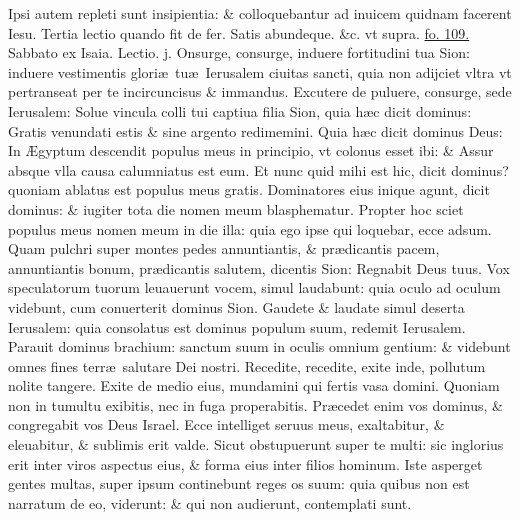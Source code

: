 \documentclass[a5paper,10pt]{book}
\def\leftmarginnote{%
	\lrmarginnote{\hskip -\marginparsep \hskip -6.5em}}
\def\ae{æ}
\def\AE{Æ}
\begin{document}
\begin{multicols*}{2}
Ipsi autem repleti sunt insipientia: \& colloquebantur ad inuicem quidnam facerent Iesu.
\newline \color{red} Tertia lectio quando fit de fer. \color{black} Satis abundeque. \color{red} \&c. vt supra. \color{black} \hyperlink{page.109}{fo. 109.}
\newline {} \color{red} \hypertarget{SAT-SECUNDA-ADV}{Sabbato} ex Isaia. \hfill Lectio. j. \color{black}
\vspace{-.25em}
Onsurge,\leftmarginnote{\begin{flushright}c. 52.\end{flushright}} consurge, induere fortitudini tua Sion: induere vestimentis glori\ae \ tu\ae \ Ierusalem ciuitas sancti, quia non adijciet vltra vt pertranseat per te incircuncisus \& immandus.
Excutere de puluere, consurge, sede Ierusalem: Solue vincula colli tui captiua filia Sion, quia h\ae c dicit dominus: Gratis venundati estis \& sine argento redimemini.
Quia h\ae c dicit dominus Deus: In \AE gyptum descendit populus meus in principio, vt colonus esset ibi: \& Assur absque vlla causa calumniatus est eum.
Et nunc quid mihi est hic, dicit dominus? quoniam ablatus est populus meus gratis.
Dominatores eius inique agunt, dicit dominus: \& iugiter tota die nomen meum blasphematur.
Propter hoc sciet populus meus nomen meum in die illa: quia ego ipse qui loquebar, ecce adsum.
Quam pulchri super montes pedes annuntiantis, \& pr\ae dicantis pacem, annuntiantis bonum, pr\ae dicantis salutem, dicentis Sion: Regnabit Deus tuus.
Vox speculatorum tuorum leuauerunt
vocem, simul laudabunt: quia oculo ad oculum videbunt, cum conuerterit dominus Sion.
Gaudete \& laudate simul deserta Ierusalem: quia consolatus est dominus populum suum, redemit Ierusalem.
Parauit dominus brachium: sanctum suum in oculis omnium gentium: \& videbunt omnes fines terr\ae \ salutare Dei nostri.
Recedite, recedite, exite inde, pollutum nolite tangere.
Exite de medio eius, mundamini qui fertis vasa domini.
Quoniam non in tumultu exibitis, nec in fuga properabitis.
Pr\ae cedet enim vos dominus, \& congregabit vos Deus Israel.
Ecce intelliget seruus meus, exaltabitur, \& eleuabitur, \& sublimis erit valde.
Sicut obstupuerunt super te multi: sic inglorius erit inter viros aspectus eius, \& forma eius inter filios hominum.
Iste asperget gentes multas, super ipsum continebunt reges os suum: quia quibus non est narratum de eo, viderunt: \& qui non audierunt, contemplati sunt.
\fancyhead[C]{\color{red} Sabbato Dominic\ae . ij. aduentus}

\end{multicols*}
\end{document}

